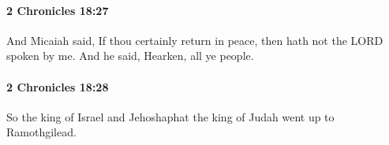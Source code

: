 		\paragraph{2 Chronicles 18:27} %
			\label{2CHRONICLES-18-27}

			And Micaiah said, If thou certainly return in peace, then hath not the LORD spoken by me. And he said, Hearken, all ye people.


		\paragraph{2 Chronicles 18:28} %
			\label{2CHRONICLES-18-28}

			So the king of Israel and Jehoshaphat the king of Judah went up to Ramothgilead.


